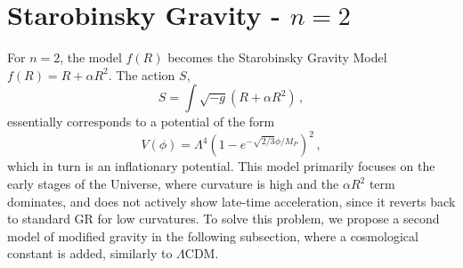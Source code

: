 \documentclass{book}
\begin{document}
	\section{Starobinsky Gravity - $n=2$}
	For $n=2$, the model $f(R)$ becomes the Starobinsky Gravity Model $f(R)=R+\alpha R^2$. The action $S$, \begin{equation}
		S=\int \sqrt{-g} \left( R+\alpha R^2 \right) \, ,
	\end{equation}
	essentially corresponds to a potential of the form
	\begin{equation}
		V(\phi)= \Lambda^4 \left( 1 - e^{-\sqrt{2/3}\phi / M_P} \right)^2 \, ,
	\end{equation} 
	which in turn is an inflationary potential. This model primarily focuses on the early stages of the Universe, where curvature is high and the $\alpha R^2$ term dominates, and does not actively show late-time acceleration, since it reverts back to standard GR for low curvatures. To solve this problem, we propose a second model of modified gravity in the following subsection, where a cosmological constant is added, similarly to $\Lambda$CDM.
	
\end{document}
